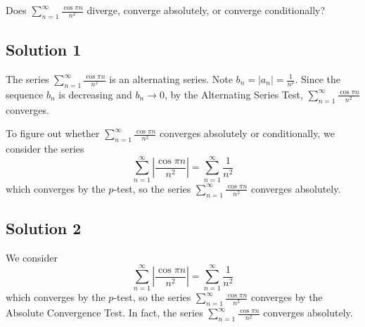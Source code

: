 \documentclass{article}
\begin{document}
\noindent
Does $\displaystyle \sum_{n=1}^\infty \frac{\cos \pi n}{n^2}$
diverge, converge absolutely, or converge conditionally?

\subsection*{Solution 1}

The series $\displaystyle \sum_{n=1}^\infty \frac{\cos \pi n}{n^2}$ is an alternating series. Note $b_n = |a_n| = \frac1{n^2}$. Since the sequence $b_n$ is decreasing and $b_n \to 0$, by the Alternating Series Test, $\displaystyle \sum_{n=1}^\infty \frac{\cos \pi n}{n^2}$ converges.

To figure out whether $\displaystyle \sum_{n=1}^\infty \frac{\cos \pi n}{n^2}$ converges absolutely or conditionally, we consider the series
\[
\sum_{n=1}^\infty \left|\frac{\cos \pi n}{n^2}\right|
= \sum_{n=1}^\infty \frac{1}{n^2}
\]
which converges by the $p$-test, so the series $\displaystyle \sum_{n=1}^\infty \frac{\cos \pi n}{n^2}$ converges absolutely.

\subsection*{Solution 2}

We consider 
\[
\sum_{n=1}^\infty \left|\frac{\cos \pi n}{n^2}\right|
= \sum_{n=1}^\infty \frac{1}{n^2}
\]
which converges by the $p$-test, so the series  $\displaystyle \sum_{n=1}^\infty \frac{\cos \pi n}{n^2}$  converges by the Absolute Convergence Test. In fact, the series  $\displaystyle \sum_{n=1}^\infty \frac{\cos \pi n}{n^2}$  converges absolutely.
\end{document}
